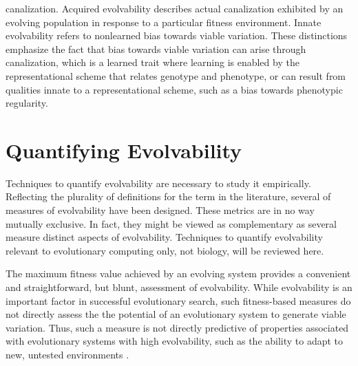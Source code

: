 canalization. Acquired evolvability describes actual canalization exhibited by an evolving population in response to a particular fitness environment. Innate evolvability refers to nonlearned bias towards viable variation. These distinctions emphasize the fact that bias towards viable variation can arise through canalization, which is a learned trait where learning is enabled by the representational scheme that relates genotype and phenotype, or can result from qualities innate to a representational scheme, such as a bias towards phenotypic regularity.

\section{Quantifying Evolvability} \label{sec:quantifying}

Techniques to quantify evolvability are necessary to study it empirically. Reflecting the plurality of definitions for the term in the literature, several of measures of evolvability have been designed. These metrics are in no way mutually exclusive. In fact, they might be viewed as complementary as several measure distinct aspects of evolvability. Techniques to quantify evolvability relevant to evolutionary computing only, not biology, will be reviewed here.

The maximum fitness value achieved by an evolving system provides a convenient and straightforward, but blunt, assessment of evolvability. While evolvability is an important factor in successful evolutionary search, such fitness-based measures do not directly assess the the potential of an evolutionary system to generate viable variation. Thus, such a measure is not directly predictive of properties associated with evolutionary systems with high evolvability, such as the ability to adapt to new, untested environments \cite{Tarapore2015EvolvabilityBenchmarks}.

